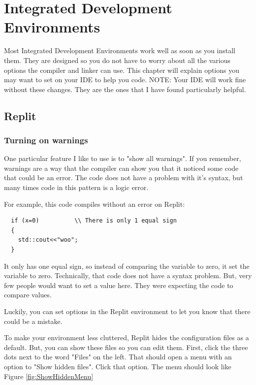 

\chapter{Integrated Development Environments}
Most Integrated Development Environments work well as soon as you install them. They are designed so you do not have to worry about all the various options the compiler and linker can use. This chapter will explain options you may want to set on your IDE to help you code. NOTE: Your IDE will work fine without these changes. They are the ones that I have found particularly helpful.  
\section{Replit}
\subsection{Turning on warnings}
\label{showwarning}
One particular feature I like to use is to "show all warnings". If you remember, warnings are a way that the compiler can show you that it noticed some code that could be an error. The code does not have a problem with it's syntax, but many times code in this pattern is a logic error.

For example, this code compiles without an error on Replit:
\begin{lstlisting}
  if (x=0)          \\ There is only 1 equal sign
  {
    std::cout<<"woo";
  }
\end{lstlisting}
It only has one equal sign, so instead of comparing the variable
to zero, it set the variable to zero. Technically, that code does not have a syntax problem. But, very few people would want to set a value here. They were expecting the code to compare values.

Luckily, you can set options in the Replit environment to let you know that there could be a mistake.

To make your environment less cluttered, Replit hides the configuration files as a default. But, you can show these files so you can edit them. First, click the three dots next to the word "Files" on the left. That should open a menu with an option to "Show hidden files". Click that option. The menu should look like Figure \ref{fig:ShowHiddenMenu}

